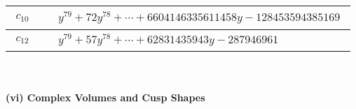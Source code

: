 \documentclass[1p]{elsarticle_modified}
\theoremstyle{definition}
\begin{document}
\begin{tabular}{m{50pt}|m{274pt}}
\hline $$\begin{aligned}c_{10}\end{aligned}$$&$\begin{aligned}
&y^{79}+72 y^{78}+\cdots+6604146335611458 y-128453594385169
\end{aligned}$\\
\hline $$\begin{aligned}c_{12}\end{aligned}$$&$\begin{aligned}
&y^{79}+57 y^{78}+\cdots+62831435943 y-287946961
\end{aligned}$\\
\hline
\end{tabular}\\~\\
\newpage\flushleft \textbf{(vi) Complex Volumes and Cusp Shapes}
\end{document}
